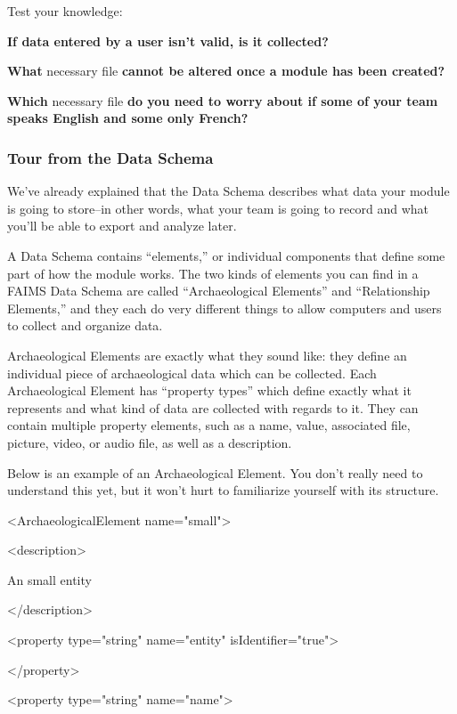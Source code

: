 Test your knowledge:

{\bf If data entered by a user isn't valid, is it collected?}

{\bf What} necessary file {\bf cannot be altered once a module has been created? }

{\bf Which} necessary file {\bf do you need to worry about if some of your team speaks English and some only French?}

\subsubsection[tour-from-the-data-schema]{Tour from the Data Schema}


We've already explained that the Data Schema describes what data your module is going to store--in other words, what your team is going to record and what you'll be able to export and analyze later.

A Data Schema contains “elements,” or individual components that define some part of how the module works. The two kinds of elements you can find in a FAIMS Data Schema are called “Archaeological Elements” and “Relationship Elements,” and they each do very different things to allow computers and users to collect and organize data.

Archaeological Elements are exactly what they sound like: they define an individual piece of archaeological data which can be collected. Each Archaeological Element has “property types” which define exactly what it represents and what kind of data are collected with regards to it. They can contain multiple property elements, such as a name, value, associated file, picture, video, or audio file, as well as a description.

Below is an example of an Archaeological Element. You don't really need to understand this yet, but it won't hurt to familiarize yourself with its structure.

<ArchaeologicalElement name="small">

<description>

An small entity

</description>

<property type="string" name="entity" isIdentifier="true">

</property>

<property type="string" name="name">

